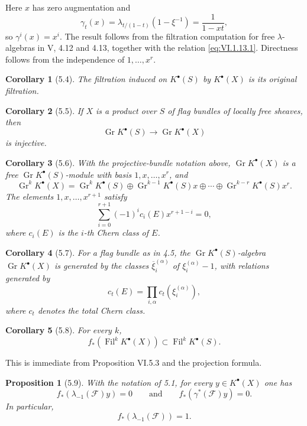 \documentclass[13pt]{extarticle}
\newcommand{\Fil}{\operatorname{Fil}}
\newcommand{\Gr}{\operatorname{Gr}}
\newtheorem*{proposition}{Proposition}
\newtheorem*{corollary}{Corollary}
\begin{document}
Here $x$ has zero augmentation and
\[
\gamma_t(x)=\lambda_{t/(1-t)}(1-\xi^{-1})=\frac{1}{1-xt},
\]
so $\gamma^i(x)=x^i$. The result follows from the filtration computation for free $\lambda$-algebras in V, 4.12 and 4.13, together with the relation \eqref{eq:VI.1.13.1}. Directness follows from the independence of $1,\ldots,x^r$.

\begin{corollary}[5.4]
The filtration induced on $K^{\bullet}(S)$ by $K^{\bullet}(X)$ is its original filtration.
\end{corollary}

\begin{corollary}[5.5]
If $X$ is a product over $S$ of flag bundles of locally free sheaves, then
\[
\Gr K^{\bullet}(S)\longrightarrow \Gr K^{\bullet}(X)
\]
is injective.
\end{corollary}

\begin{corollary}[5.6]
With the projective-bundle notation above, $\Gr K^{\bullet}(X)$ is a free $\Gr K^{\bullet}(S)$-module with basis $1,x,\ldots,x^r$, and
\[
\Gr^kK^{\bullet}(X)=\Gr^kK^{\bullet}(S)\oplus\Gr^{k-1}K^{\bullet}(S)x\oplus\cdots\oplus\Gr^{k-r}K^{\bullet}(S)x^r.
\]
The elements $1,x,\ldots,x^{r+1}$ satisfy
\begin{equation}\label{eq:VI.5.6}
\sum_{i=0}^{r+1}(-1)^ic_i(E)x^{r+1-i}=0,
\end{equation}
where $c_i(E)$ is the $i$-th Chern class of $E$.
\end{corollary}

\begin{corollary}[5.7]
For a flag bundle as in 4.5, the $\Gr K^{\bullet}(S)$-algebra $\Gr K^{\bullet}(X)$ is generated by the classes $\overline\xi_i^{(\alpha)}$ of $\xi_i^{(\alpha)}-1$, with relations generated by
\[
c_t(E)=\prod_{i,\alpha}c_t(\xi_i^{(\alpha)}),
\]
where $c_t$ denotes the total Chern class.
\end{corollary}

\begin{corollary}[5.8]
For every $k$,
\[
f_*(\Fil^kK^{\bullet}(X))\subset \Fil^kK^{\bullet}(S).
\]
\end{corollary}
This is immediate from Proposition VI.5.3 and the projection formula.

\begin{proposition}[5.9]
With the notation of 5.1, for every $y\in K^{\bullet}(X)$ one has
\[
f_*(\lambda_{-1}(\mathcal F)y)=0
\qquad\text{and}\qquad
f_*(\gamma^*(\mathcal F)y)=0.
\]
In particular,
\[
f_*(\lambda_{-1}(\mathcal F))=1.
\]
\end{proposition}
\end{document}
